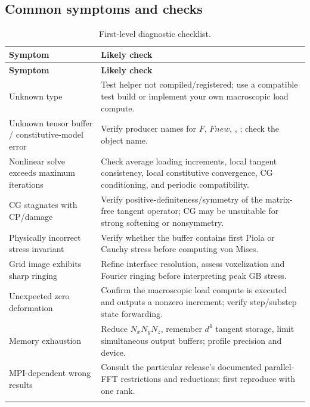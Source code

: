 \documentclass[11pt,a4paper]{article}
\newcommand{\code}[1]{\texttt{\detokenize{#1}}}
\begin{document}
\subsection{Common symptoms and checks}
\begin{longtable}{@{}p{}p{}@{}}\toprule
\textbf{Symptom} & \textbf{Likely check}\\\midrule\endfirsthead\toprule\textbf{Symptom}&\textbf{Likely check}\\\midrule\endhead
Unknown type \code{MacroscopicShearTensor} & Test helper not compiled/registered; use a compatible test build or implement your own macroscopic load compute.\\
Unknown tensor buffer / constitutive-model error & Verify producer names for $F$, $Fnew$, \code{stress}, \code{dstressdstrain}; check the \code{constitutive_model} object name.\\
Nonlinear solve exceeds maximum iterations & Check average loading increments, local tangent consistency, local constitutive convergence, CG conditioning, and periodic compatibility.\\
CG stagnates with CP/damage & Verify positive-definiteness/symmetry of the matrix-free tangent operator; CG may be unsuitable for strong softening or nonsymmetry.\\
Physically incorrect stress invariant & Verify whether the buffer contains first Piola or Cauchy stress before computing von Mises.\\
Grid image exhibits sharp ringing & Refine interface resolution, assess voxelization and Fourier ringing before interpreting peak GB stress.\\
Unexpected zero deformation & Confirm the macroscopic load compute is executed and outputs a nonzero increment; verify step/substep state forwarding.\\
Memory exhaustion & Reduce $N_xN_yN_z$, remember $d^4$ tangent storage, limit simultaneous output buffers; profile precision and device.\\
MPI-dependent wrong results & Consult the particular release's documented parallel-FFT restrictions and reductions; first reproduce with one rank.\\
\bottomrule\caption{First-level diagnostic checklist.}\end{longtable}
\end{document}
